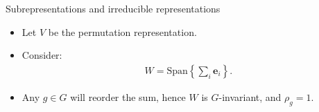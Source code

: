 \documentclass[10pt]{beamer}
\newcommand{\Sym}{\mathcal{S}}
\newcommand{\sgn}{\text{sgn}}
\newcommand{\bas}{\mathbf{e}}
\newcommand{\Span}{\text{Span}}
\begin{document}
	\begin{frame}{Subrepresentations and irreducible representations}
		\begin{example}
			\begin{itemize}
				\item Let $V$ be the permutation representation. 
				
				\item Consider:
				\begin{align*}
					W = \Span\left\lbrace \sum_i \bas_i \right\rbrace.
				\end{align*}\pause
				
				\item Any $g \in G$ will reorder the sum, hence $W$ is $G$-invariant, and $\rho_g = 1$.
				
			\end{itemize}		
		\end{example}
	\end{frame}
%				
%				
%				
	
\end{document}
